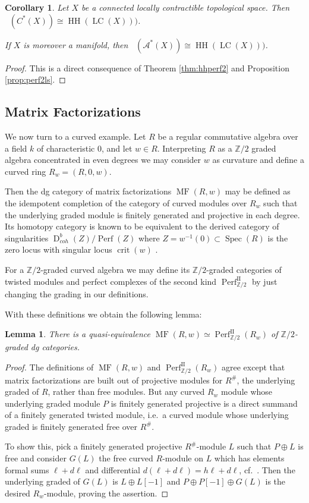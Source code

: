 \documentclass[a4paper]{amsart}
\theoremstyle{plain}
\newtheorem{lem}[thm]{Lemma}
\newtheorem{cor}[thm]{Corollary}
\theoremstyle{definition}
\theoremstyle{remark}
\newcommand{\Z}{\mathbb{Z}}
\DeclareMathOperator{\MF}{MF}
\DeclareMathOperator{\D}{D}
\DeclareMathOperator{\HH}{HH}
\DeclareMathOperator{\HHII}{HH^{\mathrm{II}}}
\DeclareMathOperator{\Perf}{Perf}
\DeclareMathOperator{\LC}{LC}
\numberwithin{equation}{section}
\theoremstyle{plain}
\begin{document}
	\begin{cor}
		Let $X$ be a connected locally contractible topological space. Then $\HHII(C^*(X)) \cong \HH(\LC(X)))$.
		
		If  $X$ is moreover a manifold, then $\HHII(\mathcal A^*(X)) \cong \HH(\LC(X)))$.
	\end{cor}
	
	\begin{proof}
		This is a direct consequence of Theorem \ref{thm:hhperf2} and Proposition \ref{prop:perf2ls}.	
	\end{proof}
	
	
		\subsection{Matrix Factorizations}
	We now turn to a curved example. Let $R$ be a regular commutative algebra over a field $k$ of characteristic 0, and let $w \in R$. 
	Interpreting $R$ as a $\Z/2$ graded algebra concentrated in even degrees we may consider $w$ as curvature and define a curved ring $R_w = (R, 0, w)$.
	
	Then the dg category of matrix factorizations $\MF(R,w)$ may be defined as the idempotent completion of the category of curved modules over $R_w$ such that the underlying graded module is finitely generated and projective in each degree. 
	Its homotopy category is known to be equivalent to the derived category of singularities $\D^b_{coh}(Z)/\Perf(Z)$ where $Z = w^{-1}(0) \subset \operatorname{Spec}(R)$ is the zero locus with singular locus $\operatorname{crit}(w)$ \cite{Orlov03}.
	
	For a $\Z/2$-graded curved algebra we may define its $\Z/2$-graded categories of twisted modules and perfect complexes of the  second kind $\Perf^{\textrm{II}}_{\Z/2}$ by just changing the grading in our definitions. 
	
	With these definitions we obtain the  following lemma:
	\begin{lem}\label{lem:mf}
		There is a quasi-equivalence $\MF(R,w) \simeq \Perf^{\mathrm{II}}_{\Z/2}(R_w)$ of $\Z/2$-graded dg categories.
	\end{lem}
	\begin{proof}
		The definitions of $\MF(R, w)$ and $\Perf^{\mathrm{II}}_{\Z/2}(R_w)$ agree except that matrix factorizations are built out of projective modules for $R^\#$,  the underlying graded  of $R$, rather than free modules.
		But any curved $R_w$ module whose underlying graded module $P$ is finitely generated projective is a direct summand of a finitely generated twisted module, i.e.\ a curved module whose underlying graded is finitely generated free over $R^\#$.
		
		To show this, pick a finitely generated projective $R^\#$-module $L$ such that $P \oplus L$ is free and consider $G(L)$ the free curved $R$-module on $L$ which has elements formal sums $\ell + d\ell$ and differential $d(\ell + d\ell) = h\ell + d\ell$, cf.\ \cite[Section 3.6]{pos11}.
		Then the underlying graded of $G(L)$ is $L\oplus L[-1]$ and $P \oplus P[-1] \oplus G(L)$ is the desired $R_w$-module, proving the assertion.
	\end{proof}
	
\end{document}
